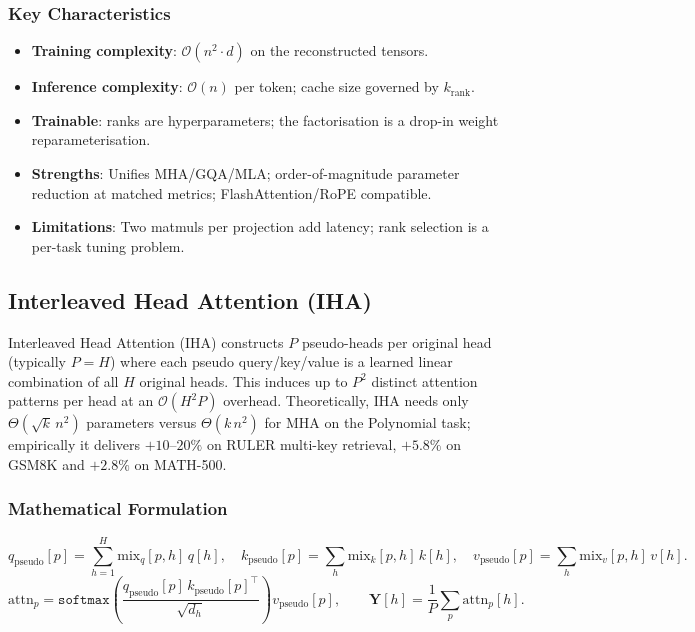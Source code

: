 \subsubsection{Key Characteristics}
\begin{itemize}[leftmargin=*]
    \item \textbf{Training complexity}: $\mathcal{O}(n^2 \cdot d)$ on the reconstructed tensors.
    \item \textbf{Inference complexity}: $\mathcal{O}(n)$ per token; cache size governed by $k_{\text{rank}}$.
    \item \textbf{Trainable}: ranks are hyperparameters; the factorisation is a drop-in weight reparameterisation.
    \item \textbf{Strengths}: Unifies MHA/GQA/MLA; order-of-magnitude parameter reduction at matched metrics; FlashAttention/RoPE compatible.
    \item \textbf{Limitations}: Two matmuls per projection add latency; rank selection is a per-task tuning problem.
\end{itemize}

\subsection{Interleaved Head Attention (IHA)}
Interleaved Head Attention (IHA) \citep{duvvuri_iha_2026} constructs $P$ pseudo-heads per original head (typically $P = H$) where each pseudo query/key/value is a learned linear combination of all $H$ original heads. This induces up to $P^2$ distinct attention patterns per head at an $\mathcal{O}(H^2 P)$ overhead. Theoretically, IHA needs only $\Theta(\sqrt{k}\, n^2)$ parameters versus $\Theta(k\, n^2)$ for MHA on the Polynomial task; empirically it delivers $+10$--$20\%$ on RULER multi-key retrieval, $+5.8\%$ on GSM8K and $+2.8\%$ on MATH-500.

\subsubsection{Mathematical Formulation}
\[
q_{\text{pseudo}}[p] = \sum_{h=1}^{H} \text{mix}_q[p, h]\, q[h], \quad
k_{\text{pseudo}}[p] = \sum_{h} \text{mix}_k[p, h]\, k[h], \quad
v_{\text{pseudo}}[p] = \sum_{h} \text{mix}_v[p, h]\, v[h].
\]
\[
\text{attn}_p = \texttt{softmax}\!\left(\frac{q_{\text{pseudo}}[p]\, k_{\text{pseudo}}[p]^\top}{\sqrt{d_h}}\right) v_{\text{pseudo}}[p],
\qquad
\mathbf{Y}[h] = \frac{1}{P} \sum_{p} \text{attn}_p[h].
\]

